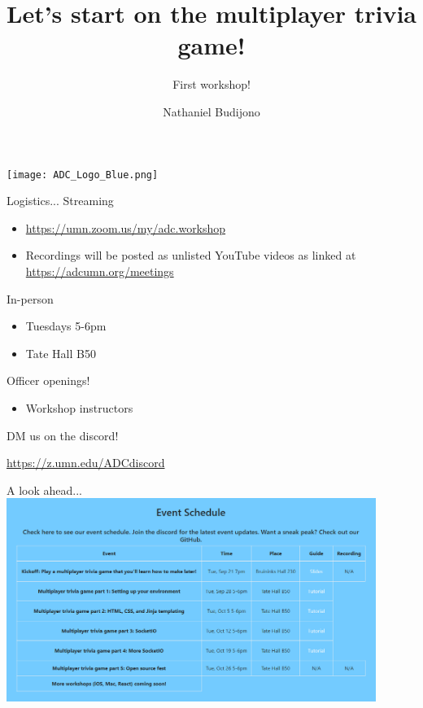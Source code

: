 \documentclass{beamer}
\title{Let's start on the multiplayer trivia game!}
\subtitle{First workshop!}
\author{Nathaniel Budijono}
\institute{UMN ADC}
\begin{document}
\begin{frame}
    \titlepage
    \texttt{[image: ADC\_Logo\_Blue.png]}
\end{frame}

\begin{frame}{Logistics...}
	Streaming
	\begin{itemize}
		\item \href{https://umn.zoom.us/my/adc.workshop}{https://umn.zoom.us/my/adc.workshop}
		\item Recordings will be posted as unlisted YouTube videos as linked at \href{https://adcumn.org/meetings}{https://adcumn.org/meetings}
	\end{itemize}

	\bigskip\pause

	In-person
	\begin{itemize}
		\item Tuesdays 5-6pm
		\item Tate Hall B50
	\end{itemize}
\end{frame}

\begin{frame}{Officer openings!}
	\begin{itemize}
		\item Workshop instructors
	\end{itemize}

	\bigskip

	DM us on the discord!

	\bigskip

	\href{https://z.umn.edu/ADCdiscord}{https://z.umn.edu/ADCdiscord}
\end{frame}

\begin{frame}{A look ahead...}
	\centering
	\includegraphics[width=0.9\textwidth]{schedule.png}
\end{frame}
\end{document}
